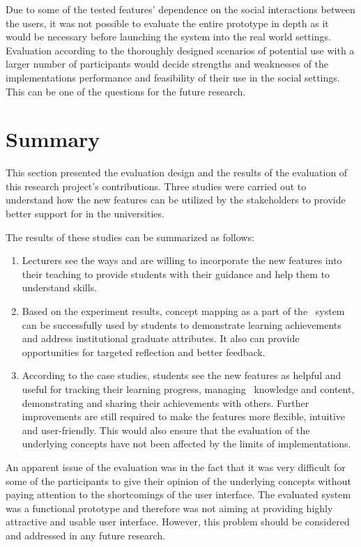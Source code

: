 Due to some of the tested features' dependence on the social interactions
between the users, it was not possible to evaluate the entire prototype in depth
as it would be necessary before launching the system into the real world
settings. Evaluation according to the thoroughly designed scenarios of potential
use with a larger number of participants would decide strengths and weaknesses
of the implementations performance and feasibility of their use in the social
settings. This can be one of the questions for the future research.

\section{Summary}

This section presented the evaluation design and the results of the evaluation
of this research project's contributions. Three studies were carried out to
understand how the new features can be utilized by the stakeholders to provide
better support for \LLLs in the universities.

The results of these studies can be summarized as follows:

\begin{enumerate}
  \item Lecturers see the ways and are willing to incorporate the new features
  into their teaching to provide students with their guidance and help them to
  understand \LLLs skills.
  \item Based on the experiment results, concept mapping as a part of the
  \ep~system can be successfully used by students to demonstrate learning
  achievements and address institutional graduate attributes. It also can
  provide opportunities for targeted reflection and better feedback.
  \item According to the case studies, students see the new features as
  helpful and useful for tracking their learning progress, managing
  \ep~knowledge and content, demonstrating and sharing their achievements with
  others. Further improvements are still required to make the features more
  flexible, intuitive and user-friendly. This would also ensure that the
  evaluation of the underlying concepts have not been affected by the limits of
  implementations.
\end{enumerate} 

An apparent issue of the evaluation was in the fact that it was very difficult
for some of the participants to give their opinion of the underlying concepts
without paying attention to the shortcomings of the user interface. The
evaluated system was a functional prototype and therefore was not aiming at
providing highly attractive and usable user interface. However, this problem
should be considered and addressed in any future research.
